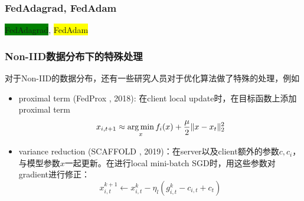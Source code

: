 
\begin{frame}
\frametitle{FedAdagrad, FedAdam}


\begin{algorithm}[H]
\SetAlgoNoLine
\DontPrintSemicolon
{}
\caption{\colorbox{green}{FedAdagrad}, \colorbox{yellow}{FedAdam}}
\end{algorithm}
\end{frame}


\begin{frame}
\frametitle{Non-IID数据分布下的特殊处理}

对于Non-IID的数据分布，还有一些研究人员对于优化算法做了特殊的处理，例如
\begin{itemize}
    \item proximal term (FedProx \cite{sahu2018fedprox}, 2018): 在client local update时，在目标函数上添加proximal term
    $$x_{i, t+1} \approx \operatorname*{arg\,min}_x f_i(x) + \dfrac{\mu}{2}\lVert x-x_t \rVert_2^2$$
    \item variance reduction (SCAFFOLD \cite{karimireddy2020scaffold}, 2019)：在server以及client额外的参数$c,c_i$，与模型参数$x$一起更新。在进行local mini-batch SGD时，用这些参数对gradient进行修正：
    $$x_{i,t}^{k+1} \gets x_{i,t}^k - \eta_l (g_{i,t}^k - c_{i,t} + c_t)$$
\end{itemize}


\end{frame}

